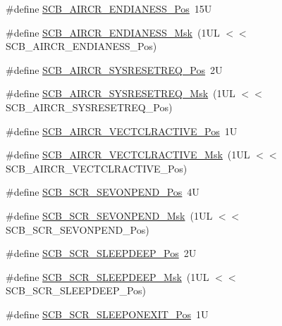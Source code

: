 \begin{DoxyCompactItemize}
\item 
\#define \hyperlink{group___c_m_s_i_s___s_c_b_gad31dec98fbc0d33ace63cb1f1a927923}{S\+C\+B\+\_\+\+A\+I\+R\+C\+R\+\_\+\+E\+N\+D\+I\+A\+N\+E\+S\+S\+\_\+\+Pos}~15U
\item 
\#define \hyperlink{group___c_m_s_i_s___s_c_b_ga2f571f93d3d4a6eac9a3040756d3d951}{S\+C\+B\+\_\+\+A\+I\+R\+C\+R\+\_\+\+E\+N\+D\+I\+A\+N\+E\+S\+S\+\_\+\+Msk}~(1\+U\+L $<$$<$ S\+C\+B\+\_\+\+A\+I\+R\+C\+R\+\_\+\+E\+N\+D\+I\+A\+N\+E\+S\+S\+\_\+\+Pos)
\item 
\#define \hyperlink{group___c_m_s_i_s___s_c_b_gaffb2737eca1eac0fc1c282a76a40953c}{S\+C\+B\+\_\+\+A\+I\+R\+C\+R\+\_\+\+S\+Y\+S\+R\+E\+S\+E\+T\+R\+E\+Q\+\_\+\+Pos}~2U
\item 
\#define \hyperlink{group___c_m_s_i_s___s_c_b_gaae1181119559a5bd36e62afa373fa720}{S\+C\+B\+\_\+\+A\+I\+R\+C\+R\+\_\+\+S\+Y\+S\+R\+E\+S\+E\+T\+R\+E\+Q\+\_\+\+Msk}~(1\+U\+L $<$$<$ S\+C\+B\+\_\+\+A\+I\+R\+C\+R\+\_\+\+S\+Y\+S\+R\+E\+S\+E\+T\+R\+E\+Q\+\_\+\+Pos)
\item 
\#define \hyperlink{group___c_m_s_i_s___s_c_b_gaa30a12e892bb696e61626d71359a9029}{S\+C\+B\+\_\+\+A\+I\+R\+C\+R\+\_\+\+V\+E\+C\+T\+C\+L\+R\+A\+C\+T\+I\+V\+E\+\_\+\+Pos}~1U
\item 
\#define \hyperlink{group___c_m_s_i_s___s_c_b_ga212c5ab1c1c82c807d30d2307aa8d218}{S\+C\+B\+\_\+\+A\+I\+R\+C\+R\+\_\+\+V\+E\+C\+T\+C\+L\+R\+A\+C\+T\+I\+V\+E\+\_\+\+Msk}~(1\+U\+L $<$$<$ S\+C\+B\+\_\+\+A\+I\+R\+C\+R\+\_\+\+V\+E\+C\+T\+C\+L\+R\+A\+C\+T\+I\+V\+E\+\_\+\+Pos)
\item 
\#define \hyperlink{group___c_m_s_i_s___s_c_b_ga3bddcec40aeaf3d3a998446100fa0e44}{S\+C\+B\+\_\+\+S\+C\+R\+\_\+\+S\+E\+V\+O\+N\+P\+E\+N\+D\+\_\+\+Pos}~4U
\item 
\#define \hyperlink{group___c_m_s_i_s___s_c_b_gafb98656644a14342e467505f69a997c9}{S\+C\+B\+\_\+\+S\+C\+R\+\_\+\+S\+E\+V\+O\+N\+P\+E\+N\+D\+\_\+\+Msk}~(1\+U\+L $<$$<$ S\+C\+B\+\_\+\+S\+C\+R\+\_\+\+S\+E\+V\+O\+N\+P\+E\+N\+D\+\_\+\+Pos)
\item 
\#define \hyperlink{group___c_m_s_i_s___s_c_b_gab304f6258ec03bd9a6e7a360515c3cfe}{S\+C\+B\+\_\+\+S\+C\+R\+\_\+\+S\+L\+E\+E\+P\+D\+E\+E\+P\+\_\+\+Pos}~2U
\item 
\#define \hyperlink{group___c_m_s_i_s___s_c_b_ga77c06a69c63f4b3f6ec1032e911e18e7}{S\+C\+B\+\_\+\+S\+C\+R\+\_\+\+S\+L\+E\+E\+P\+D\+E\+E\+P\+\_\+\+Msk}~(1\+U\+L $<$$<$ S\+C\+B\+\_\+\+S\+C\+R\+\_\+\+S\+L\+E\+E\+P\+D\+E\+E\+P\+\_\+\+Pos)
\item 
\#define \hyperlink{group___c_m_s_i_s___s_c_b_ga3680a15114d7fdc1e25043b881308fe9}{S\+C\+B\+\_\+\+S\+C\+R\+\_\+\+S\+L\+E\+E\+P\+O\+N\+E\+X\+I\+T\+\_\+\+Pos}~1U
$$
\end{DoxyCompactItemize}
